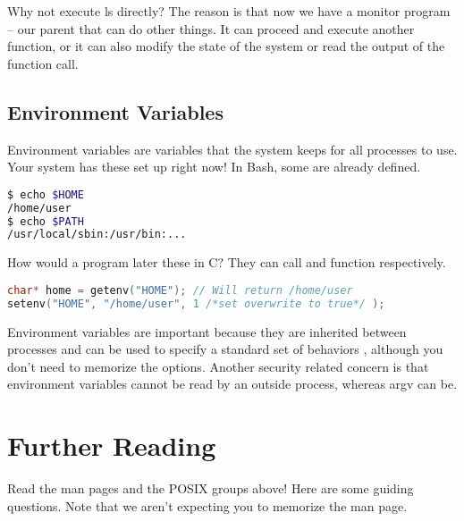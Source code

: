 Why not execute ls directly?
The reason is that now we have a monitor program -- our parent that can do other things.
It can proceed and execute another function, or it can also modify the state of the system or read the output of the function call.

\subsection{Environment Variables}

Environment variables are variables that the system keeps for all processes to use.
Your system has these set up right now!
In Bash, some are already defined.

\begin{lstlisting}[language=bash]
$ echo $HOME
/home/user
$ echo $PATH
/usr/local/sbin:/usr/bin:...
\end{lstlisting}

How would a program later these in C?
They can call  and  function respectively.

\begin{lstlisting}[language=C]
char* home = getenv("HOME"); // Will return /home/user
setenv("HOME", "/home/user", 1 /*set overwrite to true*/ );
\end{lstlisting}

Environment variables are important because they are inherited between processes and can be used to specify a standard set of behaviors \cite{env_std_2018}, although you don't need to memorize the options.
Another security related concern is that environment variables cannot be read by an outside process, whereas argv can be.

\section{Further Reading}

Read the man pages and the POSIX groups above!
Here are some guiding questions.
Note that we aren't expecting you to memorize the man page.

